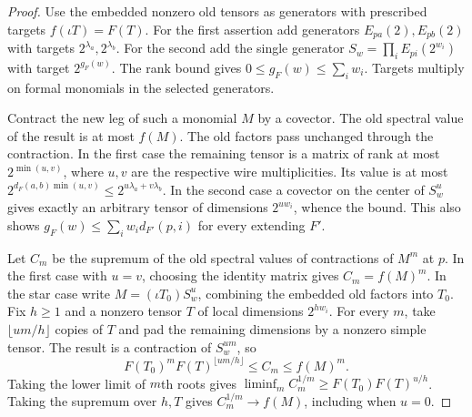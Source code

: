 \begin{proof}
Use the embedded nonzero old tensors as generators with prescribed
targets $f(\iota T)=F(T)$. For the first assertion add generators
$E_{pa}(2),E_{pb}(2)$ with targets $2^{\lambda_a},2^{\lambda_b}$.
For the second add the single generator
$S_w=\prod_i E_{pi}(2^{w_i})$ with target $2^{g_F(w)}$.
The rank bound gives $0\le g_F(w)\le\sum_i w_i$.
Targets multiply on formal monomials in the selected generators.

Contract the new leg of such a monomial $M$ by a covector. The old
spectral value of the result is at most $f(M)$. The old factors pass
unchanged through the contraction. In the first case the remaining
tensor is a matrix of rank at most $2^{\min(u,v)}$, where $u,v$ are
the respective wire multiplicities. Its value is at most
$2^{d_F(a,b)\min(u,v)}\le 2^{u\lambda_a+v\lambda_b}$.
In the second case a covector on the center of $S_w^u$ gives exactly
an arbitrary tensor of dimensions $2^{uw_i}$, whence the bound.
This also shows $g_F(w)\le\sum_i w_i d_{F'}(p,i)$ for every
extending $F'$.

Let $C_m$ be the supremum of the old spectral values of contractions of
$M^m$ at $p$. In the first case with $u=v$, choosing the identity
matrix gives $C_m=f(M)^m$. In the star case write
$M=(\iota T_0)S_w^u$, combining the embedded old factors into $T_0$.
Fix $h\ge1$ and a nonzero tensor $T$ of local dimensions $2^{hw_i}$.
For every $m$, take $\lfloor um/h\rfloor$ copies of $T$ and pad the
remaining dimensions by a nonzero simple tensor. The result is a
contraction of $S_w^{um}$, so
\[
  F(T_0)^m F(T)^{\lfloor um/h\rfloor}\le C_m\le f(M)^m .
\]
Taking the lower limit of $m$th roots gives
$\liminf_m C_m^{1/m}\ge F(T_0)F(T)^{u/h}$. Taking the supremum over
$h,T$ gives $C_m^{1/m}\to f(M)$, including when $u=0$.


\end{proof}
